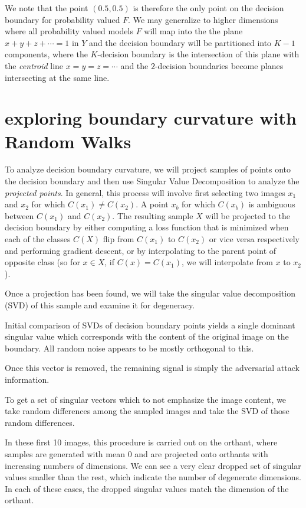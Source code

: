 \documentclass[10pt]{extarticle}
\begin{document}
We note that the point $(0.5, 0.5)$ is therefore the only point on the decision boundary for probability valued $F$. We may generalize to higher dimensions where all probability valued models $F$ will map into the the plane $x + y + z + \cdots = 1$ in $Y$ and the decision boundary will be partitioned into $K-1$ components, where the $K$-decision boundary is the intersection of this plane with the \emph{centroid} line $x = y = z = \cdots$ and the $2$-decision boundaries become planes intersecting at the same line. 

\section{exploring boundary curvature with Random Walks}

To analyze decision boundary curvature, we will project samples of points onto the decision boundary and then use Singular Value Decomposition to analyze the \emph{projected points}. In general, this process will involve first selecting two images $x_1$ and $x_2$ for which $C(x_1) \neq C(x_2)$. A point $x_b$ for which $C(x_b)$ is ambiguous between $C(x_1)$ and $C(x_2)$. The resulting sample $X$ will be projected to the decision boundary by either computing a loss function that is minimized when each of the classes $C(X)$ flip from $C(x_1)$ to $C(x_2)$ or vice versa respectively and performing gradient descent, or by interpolating to the parent point of opposite class (so for $x \in X$, if $C(x) = C(x_1)$, we will interpolate from $x$ to $x_2$). 

Once a projection has been found, we will take the singular value decomposition (SVD) of this sample and examine it for degeneracy. 


Initial comparison of SVDs of decision boundary points yields a single dominant singular value which corresponds with the content of the original image on the boundary. All random noise appears to be mostly orthogonal to this. 

Once this vector is removed, the remaining signal is simply the adversarial attack information. 

To get a set of singular vectors which to not emphasize the image content, we take random differences among the sampled images and take the SVD of those random differences. 

In these first 10 images, this procedure is carried out on the orthant, where samples are generated with mean 0 and are projected onto orthants with increasing numbers of dimensions. We can see a very clear dropped set of singular values smaller than the rest, which indicate the number of degenerate dimensions. In each of these cases, the dropped singular values match the dimension of the orthant. 
\end{document}
